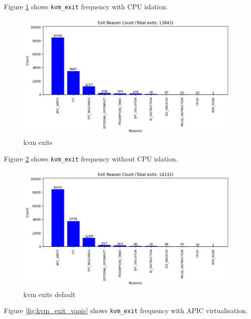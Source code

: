 \documentclass[MMR,Master,english]{twbook}
\begin{document}
\clearpage
Figure \ref{fig:kvm_exit_taskset} shows \texttt{kvm\_exit} frequency with CPU islation.
\begin{figure}[H]
	\centering
	\includegraphics[width=1.0\columnwidth]{img/kvm_exits_taskset.png}
	\caption[kvm exits]{kvm exits}
	\label{fig:kvm_exit_taskset}
\end{figure}

Figure \ref{fig:kvm_exits_default} shows \texttt{kvm\_exit} frequency without CPU islation.
\begin{figure}[H]
	\centering
	\includegraphics[width=1.0\columnwidth]{img/kvm_exits_default.png}
	\caption[kvm exits default]{kvm exits default}
	\label{fig:kvm_exits_default}
\end{figure}

\clearpage

Figure \ref{fig:kvm_exit_vapic} shows \texttt{kvm\_exit} frequency with APIC virtualisation.
\end{document}
